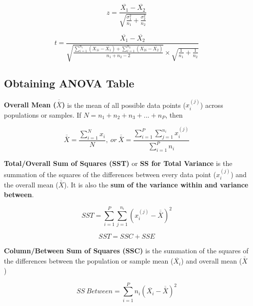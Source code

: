 \documentclass{article}
\begin{document}
\begin{equation}
    z = \frac{\overline{X_1} - \overline{X_2}}{\sqrt{\frac{\sigma_1^2}{n_1} + \frac{\sigma_2^2}{n_2}}}
\end{equation}

\begin{equation}
    t = \frac{\overline{X_1} - \overline{X_2}}{\sqrt{\frac{\sum_{i=1}^{n_1} (X_{1i} - \overline{X_1}) + \sum_{i=1}^{n_2} (X_{2i} - \overline{X_2})}{n_1 + n_2 - 2}} \times \sqrt{\frac{1}{n_1} + \frac{1}{n_2}}}
\end{equation}

\subsection{Obtaining ANOVA Table}

\textbf{Overall Mean ($\overline{\overline{X}}$)} is the mean of all possible data points ($x_{i}^{(j)}$) across populations or samples. If $N = n_1 + n_2 + n_3 + ... + n_P$, then

\begin{equation}
    \overline{\overline{X}} = \frac{\sum_{i=1}^{N} x_i}{N},\ or\ \overline{\overline{X}} = \frac{\sum_{i=1}^{P}\sum_{j=1}^{n_i} x_{i}^{(j)}}{\sum_{i=1}^{P}n_i}
\end{equation}

\textbf{Total/Overall Sum of Squares (SST)} or \textbf{SS for Total Variance} is the summation of the squares of the differences between every data point ($x_{i}^{(j)}$) and the overall mean ($\overline{\overline{X}}$). It is also the \textbf{sum of the variance within and variance between}.

\begin{equation}
    SST = \sum_{i=1}^{P}\sum_{j=1}^{n_i} (x_{i}^{(j)} - \overline{\overline{X}})^2
\end{equation}

\begin{equation}
    SST = SSC + SSE
\end{equation}

\textbf{Column/Between Sum of Squares (SSC)} is the summation of the squares of the differences between the population or sample mean ($\overline{X_i}$) and overall mean ($\overline{\overline{X}}$)

\begin{equation}
    SS\ Between = \sum_{i=1}^{P} n_i (\overline{X_i} - \overline{\overline{X}})^2
\end{equation}
\end{document}
